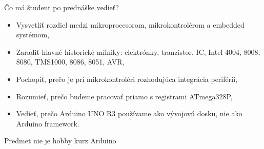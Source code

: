 \begin{frame}{Čo má študent po prednáške vedieť?}
\begin{itemize}
  \item Vysvetliť rozdiel medzi mikroprocesorom, mikrokontrolérom a embedded systémom,
  \item Zaradiť hlavné historické míľniky: elektrónky, tranzistor, IC, Intel 4004, 8008, 8080, TMS1000, 8086, 8051, AVR,
  \item Pochopiť, prečo je pri mikrokontroléri rozhodujúca integrácia periférií,
  \item Rozumieť, prečo budeme pracovať priamo s registrami ATmega328P,
  \item Vedieť, prečo Arduino UNO R3 používame ako vývojovú dosku, nie ako Arduino framework.
\end{itemize}
\end{frame}

\begin{frame}{Predmet nie je hobby kurz Arduino}
\begin{columns}[T,onlytextwidth]
\end{columns}
\end{frame}



